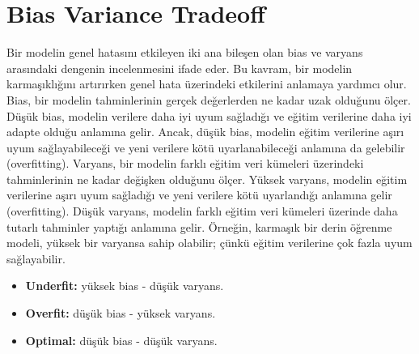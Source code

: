 \section{Bias Variance Tradeoff}
Bir modelin genel hatasını etkileyen iki ana bileşen olan bias ve varyans arasındaki dengenin incelenmesini ifade eder. Bu kavram, bir modelin karmaşıklığını artırırken genel hata üzerindeki etkilerini anlamaya yardımcı olur. Bias, bir modelin tahminlerinin gerçek değerlerden ne kadar uzak olduğunu ölçer. Düşük bias, modelin verilere daha iyi uyum sağladığı ve eğitim verilerine daha iyi adapte olduğu anlamına gelir. Ancak, düşük bias, modelin eğitim verilerine aşırı uyum sağlayabileceği ve yeni verilere kötü uyarlanabileceği anlamına da gelebilir (overfitting). Varyans, bir modelin farklı eğitim veri kümeleri üzerindeki tahminlerinin ne kadar değişken olduğunu ölçer. Yüksek varyans, modelin eğitim verilerine aşırı uyum sağladığı ve yeni verilere kötü uyarlandığı anlamına gelir (overfitting). Düşük varyans, modelin farklı eğitim veri kümeleri üzerinde daha tutarlı tahminler yaptığı anlamına gelir. Örneğin, karmaşık bir derin öğrenme modeli, yüksek bir varyansa sahip olabilir; çünkü eğitim verilerine çok fazla uyum sağlayabilir.

\begin{itemize}
	\item \textbf{Underfit:} yüksek bias - düşük varyans.
	\item \textbf{Overfit:} düşük bias - yüksek varyans.
	\item \textbf{Optimal:} düşük bias - düşük varyans.
\end{itemize}

\newpage